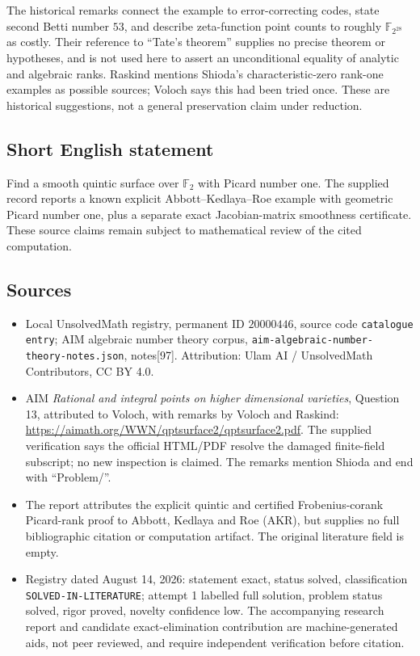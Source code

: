 \documentclass[11pt]{article}
\newcommand{\F}{\mathbb{F}}
\begin{document}
The historical remarks connect the example to error-correcting codes, state second Betti number \(53\), and describe zeta-function point counts to roughly \(\F_{2^{28}}\) as costly. Their reference to ``Tate's theorem'' supplies no precise theorem or hypotheses, and is not used here to assert an unconditional equality of analytic and algebraic ranks. Raskind mentions Shioda's characteristic-zero rank-one examples as possible sources; Voloch says this had been tried once. These are historical suggestions, not a general preservation claim under reduction.
\subsection{Short English statement}
Find a smooth quintic surface over \(\F_2\) with Picard number one. The supplied record reports a known explicit Abbott--Kedlaya--Roe example with geometric Picard number one, plus a separate exact Jacobian-matrix smoothness certificate. These source claims remain subject to mathematical review of the cited computation.
\subsection{Sources}
\begin{itemize}
\item Local UnsolvedMath registry, permanent ID \(20000446\), source code \texttt{catalogue entry}; AIM algebraic number theory corpus, \texttt{aim-algebraic-number-theory-notes.json}, notes[97]. Attribution: Ulam AI / UnsolvedMath Contributors, CC BY 4.0.
\item AIM \emph{Rational and integral points on higher dimensional varieties}, Question 13, attributed to Voloch, with remarks by Voloch and Raskind: \url{https://aimath.org/WWN/qptsurface2/qptsurface2.pdf}. The supplied verification says the official HTML/PDF resolve the damaged finite-field subscript; no new inspection is claimed. The remarks mention Shioda and end with ``Problem/''.
\item The report attributes the explicit quintic and certified Frobenius-corank Picard-rank proof to Abbott, Kedlaya and Roe (AKR), but supplies no full bibliographic citation or computation artifact. The original literature field is empty.
\item Registry dated August 14, 2026: statement exact, status solved, classification \texttt{SOLVED-IN-LITERATURE}; attempt 1 labelled full solution, problem status solved, rigor proved, novelty confidence low. The accompanying research report and candidate exact-elimination contribution are machine-generated aids, not peer reviewed, and require independent verification before citation.
\end{itemize}
\end{document}
